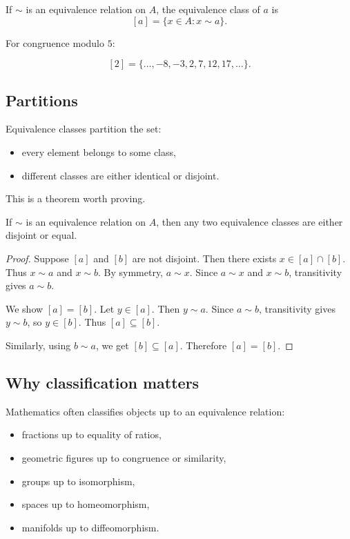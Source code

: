 \documentclass[12pt]{article}
\begin{document}
If $\sim$ is an equivalence relation on $A$, the equivalence class of $a$ is
\[
[a]=\{x\in A:x\sim a\}.
\]

For congruence modulo $5$:

\[
[2]=\{\ldots,-8,-3,2,7,12,17,\ldots\}.
\]

\subsection{Partitions}

Equivalence classes partition the set:

\begin{itemize}
\item every element belongs to some class,
\item different classes are either identical or disjoint.
\end{itemize}

This is a theorem worth proving.

\begin{theorem}
If $\sim$ is an equivalence relation on $A$, then any two equivalence classes are either disjoint or equal.
\end{theorem}

\begin{proof}
Suppose $[a]$ and $[b]$ are not disjoint. Then there exists $x\in[a]\cap[b]$. Thus $x\sim a$ and $x\sim b$. By symmetry, $a\sim x$. Since $a\sim x$ and $x\sim b$, transitivity gives $a\sim b$.

We show $[a]=[b]$. Let $y\in[a]$. Then $y\sim a$. Since $a\sim b$, transitivity gives $y\sim b$, so $y\in[b]$. Thus $[a]\subseteq[b]$.

Similarly, using $b\sim a$, we get $[b]\subseteq[a]$. Therefore $[a]=[b]$.
\end{proof}

\subsection{Why classification matters}

Mathematics often classifies objects up to an equivalence relation:

\begin{itemize}
\item fractions up to equality of ratios,
\item geometric figures up to congruence or similarity,
\item groups up to isomorphism,
\item spaces up to homeomorphism,
\item manifolds up to diffeomorphism.
\end{itemize}
\end{document}
